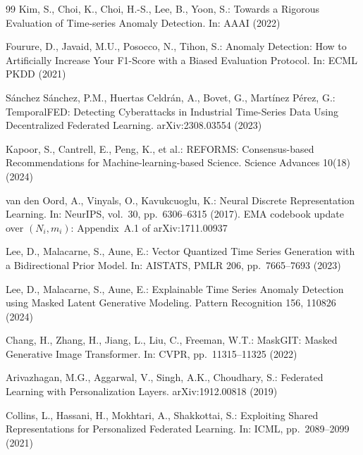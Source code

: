 \documentclass[11pt]{article}
\theoremstyle{plain}
\theoremstyle{definition}
\begin{document}
\begin{thebibliography}{99}
Kim, S., Choi, K., Choi, H.-S., Lee, B., Yoon, S.:
Towards a Rigorous Evaluation of Time-series Anomaly Detection. In: AAAI (2022)

Fourure, D., Javaid, M.U., Posocco, N., Tihon, S.:
Anomaly Detection: How to Artificially Increase Your F1-Score with a Biased
Evaluation Protocol. In: ECML PKDD (2021)

S\'anchez S\'anchez, P.M., Huertas Celdr\'an, A., Bovet, G., Mart\'inez P\'erez, G.:
TemporalFED: Detecting Cyberattacks in Industrial Time-Series Data Using
Decentralized Federated Learning. arXiv:2308.03554 (2023)

Kapoor, S., Cantrell, E., Peng, K., et al.:
REFORMS: Consensus-based Recommendations for Machine-learning-based Science.
Science Advances 10(18) (2024)

van den Oord, A., Vinyals, O., Kavukcuoglu, K.:
Neural Discrete Representation Learning. In: NeurIPS, vol.\ 30, pp.\ 6306--6315 (2017).
EMA codebook update over $(N_i,m_i)$: Appendix~A.1 of arXiv:1711.00937

Lee, D., Malacarne, S., Aune, E.:
Vector Quantized Time Series Generation with a Bidirectional Prior Model.
In: AISTATS, PMLR 206, pp.\ 7665--7693 (2023)

Lee, D., Malacarne, S., Aune, E.:
Explainable Time Series Anomaly Detection using Masked Latent Generative Modeling.
Pattern Recognition 156, 110826 (2024)

Chang, H., Zhang, H., Jiang, L., Liu, C., Freeman, W.T.:
MaskGIT: Masked Generative Image Transformer. In: CVPR, pp.\ 11315--11325 (2022)

Arivazhagan, M.G., Aggarwal, V., Singh, A.K., Choudhary, S.:
Federated Learning with Personalization Layers. arXiv:1912.00818 (2019)

Collins, L., Hassani, H., Mokhtari, A., Shakkottai, S.:
Exploiting Shared Representations for Personalized Federated Learning.
In: ICML, pp.\ 2089--2099 (2021)


\end{thebibliography}
\end{document}
